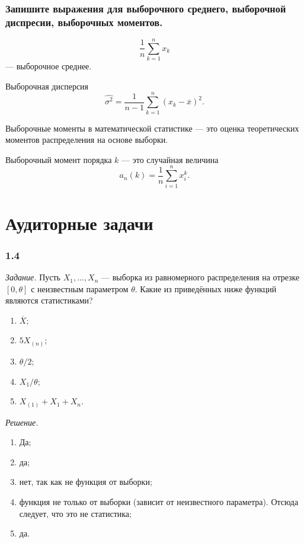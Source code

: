 \subsubsection*{Запишите выражения для выборочного среднего, выборочной диспресии,
                выборочных моментов.}

$$ \frac{1}{n} \sum \limits_{k = 1}^n x_k$$
--- выборочное среднее.

Выборочная дисперсия
$$ \hat{ \sigma^2} =
  \frac{1}{n - 1} \sum \limits_{k = 1}^n \left( x_k - \overline{x} \right)^2.$$

Выборочные моменты в математической статистике ---
это оценка теоретических моментов распределения на основе выборки.

Выборочный момент порядка $k$ --- это случайная величина
$$a_n \left( k \right) =
   \frac{1}{n} \sum \limits_{i = 1}^n x_i^k.$$

\section*{Аудиторные задачи}

\subsubsection*{1.4}

\textit{Задание.}
Пусть $X_1, \dotsc, X_n$ ---
выборка из равномерного распределения на отрезке $ \left[0, \theta \right] $
с неизвестным параметром $ \theta $.
Какие из приведённых ниже функций являются статистиками?
\begin{enumerate}[label=\alph*)]
  \item $ \overline{X}$;
  \item $5X_{ \left( n \right) }$;
  \item $ \theta / 2$;
  \item $X_1 / \theta $;
  \item $X_{ \left( 1 \right) } + X_1 + X_n$.
\end{enumerate}

\textit{Решение.}
\begin{enumerate}[label=\alph*)]
  \item Да;
  \item да;
  \item нет, так как не функция от выборки;
  \item функция не только от выборки (зависит от неизвестного параметра).
  Отсюда следует, что это не статистика;
  \item да.
\end{enumerate}

